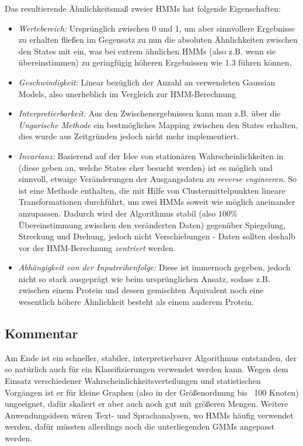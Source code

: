 \documentclass{DEarticle}
\begin{document}
Das resultierende Ähnlichkeitsmaß zweier HMMs hat folgende Eigenschaften:
\begin{itemize}
\item \emph{Wertebereich:} Ursprünglich zwischen 0 und 1, um aber sinnvollere Ergebnisse zu erhalten fließen im Gegensatz
zu \cite{randomwalk} nun die absoluten Ähnlichkeiten zwischen den States mit ein, was bei extrem ähnlichen HMMs (also
z.B. wenn sie übereinstimmen) zu geringfügig höheren Ergebnissen wie 1.3 führen können.
\item \emph{Geschwindigkeit:} Linear bezüglich der Anzahl an verwendeten Gaussian Models, also unerheblich im Vergleich
zur HMM-Berechnung
\item \emph{Interpretierbarkeit:} Aus den Zwischenergebnissen kann man z.B. über die \emph{Ungarische Methode} ein
bestmögliches Mapping zwischen den States erhalten, dies wurde aus Zeitgründen jedoch nicht mehr implementiert.
\item \emph{Invarianz:} Basierend auf der Idee von stationären Wahrscheinlichkeiten in \cite{randomwalk}
(diese geben an, welche States eher besucht werden) ist es möglich und sinnvoll, etwaige Veränderungen der Ausgangsdaten
zu \emph{reverse engineeren}. So ist eine Methode enthalten, die mit Hilfe von Clustermittelpunkten lineare
Transformationen durchführt, um zwei HMMs soweit wie möglich aneinander anzupassen.
Dadurch wird der Algorithmus stabil (also $100\%$ Übereinstimmung zwischen den veränderten Daten) gegenüber Spiegelung, Streckung und Drehung, jedoch nicht Verschiebungen - 
Daten sollten deshalb vor der HMM-Berechnung \emph{zentriert} werden.
\item \emph{Abhängigkeit von der Inputreihenfolge:} Diese ist immernoch gegeben, jedoch nicht so stark ausgeprägt wie
beim ursprünglichen Ansatz, sodass z.B. zwischen einem Protein und dessen gemischten Äquivalent noch eine wesentlich
höhere Ähnlichkeit besteht als einem anderem Protein.

\end{itemize}

\subsection{Kommentar}
Am Ende ist ein schneller, stabiler, interpretierbarer Algorithmus entstanden, der so natürlich auch für ein
Klassifizierungen verwendet werden kann.
Wegen dem Einsatz verschiedener Wahrscheinlichkeitsverteilungen und statistischen Vorgängen ist er für kleine Graphen
(also in der Größenordnung bis ~100 Knoten) ungeeignet, dafür skaliert er aber auch noch gut mit größeren Mengen. 
Weitere Anwendungsideen wären Text- und Sprachanalysen, wo HMMs häufig verwendet werden, dafür müssten allerdings noch
die unterliegenden GMMs angepasst werden.
\end{document}
